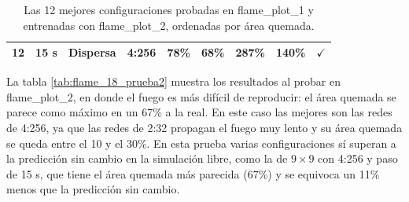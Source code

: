 \begin{table}[htbp]
\begin{tabular}{@{}ccccccccc@{}}
			12 & 15 s & Dispersa & 4:256 & 78\% & 68\% & 287\% & 140\% & $\checkmark$ \\
			\bottomrule
		\end{tabular}
		\caption{Las 12 mejores configuraciones probadas en flame\_plot\_1 y entrenadas con flame\_plot\_2, ordenadas por área quemada.}
		\label{tab:flame_18_prueba1}
	\end{table}

	

	La tabla \ref{tab:flame_18_prueba2} muestra los resultados al probar en flame\_plot\_2, en donde el fuego es más difícil de reproducir: el área quemada se parece como máximo en un 67\% a la real. En este caso las mejores son las redes de 4:256, ya que las redes de 2:32 propagan el fuego muy lento y su área quemada se queda entre el 10 y el 30\%. En esta prueba varias configuraciones sí superan a la predicción sin cambio en la simulación libre, como la de $9 \times 9$ con 4:256 y paso de 15 s, que tiene el área quemada más parecida (67\%) y se equivoca un 11\% menos que la predicción sin cambio.


